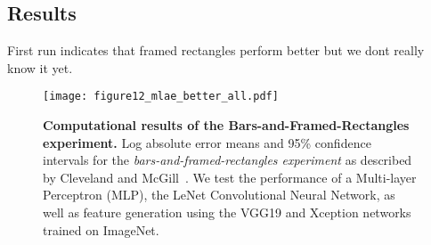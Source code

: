 %
%
%	
%


\subsection{Results}

First run indicates that framed rectangles perform better but we dont really know it yet.

\begin{figure}[t]
	  \texttt{[image: figure12\_mlae\_better\_all.pdf]}
  \caption{\textbf{Computational results of the Bars-and-Framed-Rectangles experiment.} Log absolute error means and 95\% confidence intervals for the \emph{bars-and-framed-rectangles experiment} as described by Cleveland and McGill~\cite{cleveland_mcgill}. We test the performance of a Multi-layer Perceptron (MLP), the LeNet Convolutional Neural Network, as well as feature generation using the VGG19 and Xception networks trained on ImageNet.}
	\label{fig:figure12_mlae}
\end{figure}


